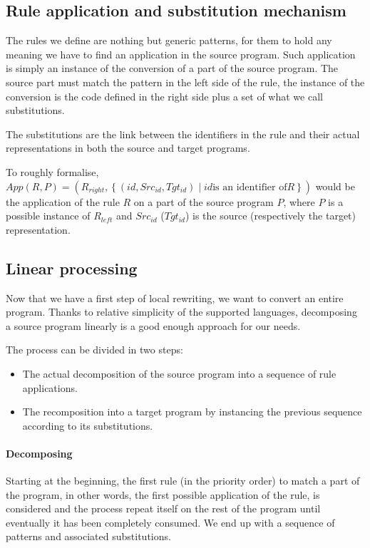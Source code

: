 \subsection{Rule application and substitution mechanism}
The rules we define are nothing but generic patterns, for them
to hold any meaning we have to find an application in the source program.
Such application is simply an instance of the conversion of a part
of the source program. The source part must match the pattern in the
left side of the rule, the instance of the conversion is the code
defined in the right side plus a set of what we call substitutions.

The substitutions are the link between the identifiers in the rule
and their actual representations in both the source and target programs.

To roughly formalise,
$App(R, P) = \left(R_{right}, \left\{\left(id,Src_{id},Tgt_{id}\right) \mid id \text{is an identifier of} R\right\}\right)$
would be the application of the rule $R$ on a part of the source program $P$,
where $P$ is a possible instance of $R_{left}$ and $Src_{id}$ ($Tgt_{id}$) is the source
(respectively the target) representation.

\subsection{Linear processing}
Now that we have a first step of local rewriting, we want to convert an entire
program. Thanks to relative simplicity of the supported languages, decomposing
a source program linearly is a good enough approach for our needs.

The process can be divided in two steps:
\begin{itemize}
\item The actual decomposition of the source program into a sequence of rule applications.
\item The recomposition into a target program by instancing the previous sequence
according to its substitutions.
\end{itemize}

\paragraph{Decomposing}
Starting at the beginning, the first rule (in the priority order) to match
a part of the program, in other words, the first possible application of the rule,
is considered and the process repeat itself on the rest of the program until
eventually it has been completely consumed. We end up with a sequence of
patterns and associated substitutions.

